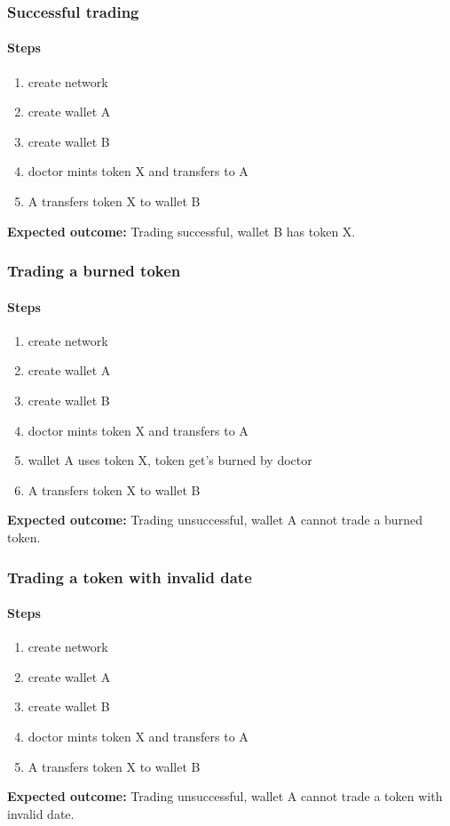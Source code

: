 \subsubsection{Successful trading}
\paragraph*{Steps}
\begin{enumerate}
  \item create network
  \item create wallet A
  \item create wallet B
  \item doctor mints token X and transfers to A
  \item A transfers token X to wallet B
\end{enumerate}
\textbf{Expected outcome:} Trading successful, wallet B has token X.

\subsubsection{Trading a burned token}
\paragraph*{Steps}
\begin{enumerate}
  \item create network
  \item create wallet A
  \item create wallet B
  \item doctor mints token X and transfers to A
  \item wallet A uses token X, token get's burned by doctor
  \item A transfers token X to wallet B
\end{enumerate}
\textbf{Expected outcome:} Trading unsuccessful, wallet A cannot trade a burned token.

\subsubsection{Trading a token with invalid date}
\paragraph*{Steps}
\begin{enumerate}
  \item create network
  \item create wallet A
  \item create wallet B
  \item doctor mints token X and transfers to A
  \item A transfers token X to wallet B
\end{enumerate}
\textbf{Expected outcome:} Trading unsuccessful, wallet A cannot trade a token with invalid date.

